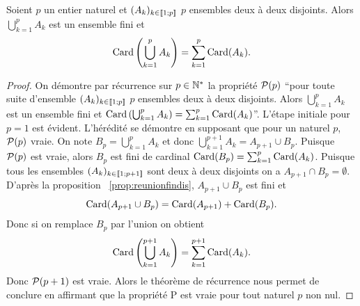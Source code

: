 \begin{prop}
  Soient \(p\) un entier naturel et \((A_k)_{k\in\intervalleentier{1}{p}}\) \(p\) ensembles deux à deux disjoints. Alors \(\bigcup_{k=1}^{p}A_k\) est un ensemble fini et
  \begin{equation}
    \Card\left(\bigcup_{k=1}^{p}A_k\right)=\sum_{k=1}^{p}\Card(A_k).
  \end{equation}
\end{prop}
\begin{proof}
  On démontre par récurrence sur \(p\in \N^*\) la propriété \(\P(p)\) ``pour toute suite d'ensemble \((A_k)_{k\in\intervalleentier{1}{p}}\) \(p\) ensembles deux à deux disjoints. Alors \(\bigcup_{k=1}^{p}A_k\) est un ensemble fini et \(\Card\left(\bigcup_{k=1}^{p}A_k\right)=\sum_{k=1}^{p}\Card(A_k)\)''. L'étape initiale pour \(p=1\) est évident. L'hérédité se démontre en supposant que pour un naturel \(p\), \(\P(p)\) vraie. On note \(B_p=\bigcup_{k=1}^{p}A_k\) et donc \(\bigcup_{k=1}^{p+1}A_k=A_{p+1}\cup B_p\). Puisque \(\P(p)\) est vraie, alors \(B_p\) est fini de cardinal \(\Card(B_p)=\sum_{k=1}^{p}\Card(A_k)\). Puisque tous les ensembles \((A_k)_{k\in\intervalleentier{1}{p+1}}\) sont deux à deux disjoints on a \(A_{p+1}\cap B_p=\emptyset\). D'après la proposition~
\ref{prop:reunionfindis}, \(A_{p+1}\cup B_p\) est fini et
\begin{equation}
  \Card(A_{p+1}\cup B_p) = \Card(A_{p+1})+\Card(B_p).
\end{equation}
Donc si on remplace \(B_p\) par l'union on obtient
\begin{equation}
  \Card\left(\bigcup_{k=1}^{p+1}A_k\right) = \sum_{k=1}^{p+1}\Card(A_k).
\end{equation}
Donc \(\P(p+1)\) est vraie. Alors le théorème de récurrence nous permet de conclure en affirmant que la propriété P est vraie pour tout naturel \(p\) non nul.
\end{proof}

